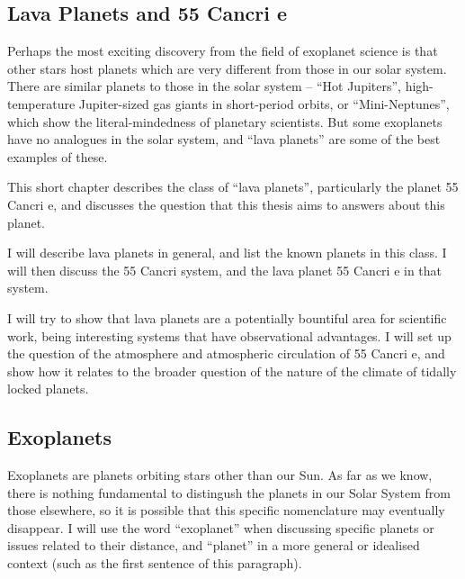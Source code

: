 \begin{SingleSpace}
\chapter{Lava Planets and 55 Cancri e}
\vspace{0.5cm}
\end{SingleSpace}
\vspace{0.5cm}





Perhaps the most exciting discovery from the field of exoplanet science is that other stars host planets which are very different from those in our solar system. There are similar planets to those in the solar system -- ``Hot Jupiters'', high-temperature Jupiter-sized gas giants in short-period orbits, or ``Mini-Neptunes'', which show the literal-mindedness of planetary scientists. But some exoplanets have no analogues in the solar system, and ``lava planets'' are some of the best examples of these.


This short chapter describes the class of ``lava planets'', particularly the planet 55 Cancri e, and discusses the question that this thesis aims to answers about this planet.

I will describe lava planets in general, and list the known planets in this class. I will then discuss the 55 Cancri system, and the lava planet 55 Cancri e in that system.

I will try to show that lava planets are a potentially bountiful area for scientific work, being interesting systems that have observational advantages. I will set up the question of the atmosphere and atmospheric circulation of 55 Cancri e, and show how it relates to the broader question of the nature of the climate of tidally locked planets.


\section{Exoplanets}

Exoplanets are planets orbiting stars other than our Sun. As far as we know, there is nothing fundamental to distingush the planets in our Solar System from those elsewhere, so it is possible that this specific nomenclature may eventually disappear. I will use the word ``exoplanet''  when discussing specific planets or issues related to their distance, and ``planet'' in a more general or idealised context (such as the first sentence of this paragraph).

